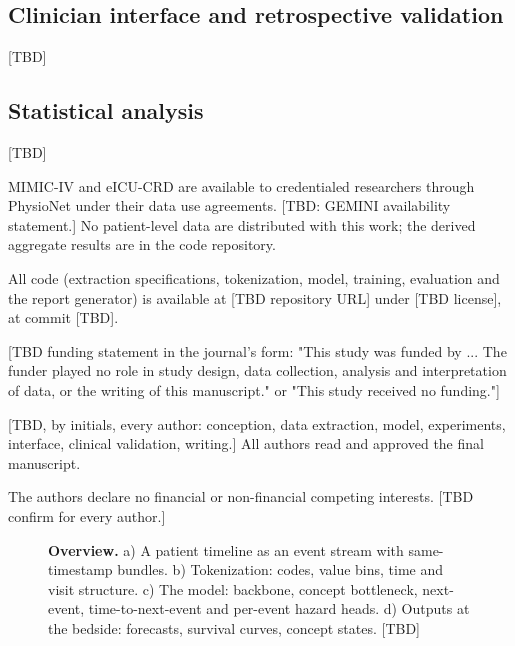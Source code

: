 \documentclass[pdflatex,sn-nature]{sn-jnl}
\begin{document}
\subsection{Clinician interface and retrospective validation}\label{sec:m-interface}
[TBD]

\subsection{Statistical analysis}\label{sec:m-stats}
[TBD]

\backmatter

MIMIC-IV and eICU-CRD are available to credentialed researchers through PhysioNet under their data use agreements. [TBD: GEMINI availability statement.] No patient-level data are distributed with this work; the derived aggregate results are in the code repository.

All code (extraction specifications, tokenization, model, training, evaluation and the report generator) is available at [TBD repository URL] under [TBD license], at commit [TBD].

[TBD funding statement in the journal's form: "This study was funded by ... The funder played no role in study design, data collection, analysis and interpretation of data, or the writing of this manuscript." or "This study received no funding."]

[TBD, by initials, every author: conception, data extraction, model, experiments, interface, clinical validation, writing.] All authors read and approved the final manuscript.

The authors declare no financial or non-financial competing interests. [TBD confirm for every author.]

\begin{figure}[h]
\centering
\caption{\textbf{Overview.} a) A patient timeline as an event stream with same-timestamp bundles. b) Tokenization: codes, value bins, time and visit structure. c) The model: backbone, concept bottleneck, next-event, time-to-next-event and per-event hazard heads. d) Outputs at the bedside: forecasts, survival curves, concept states. [TBD]}\label{fig:overview}
\end{figure}
\end{document}
